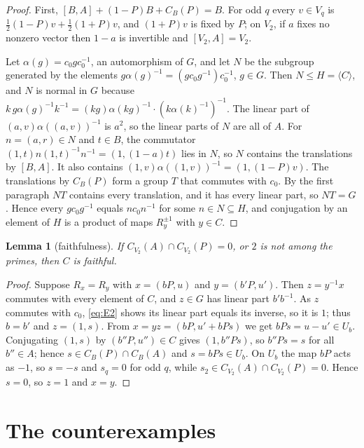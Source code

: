 \documentclass[11pt]{article}
\newtheorem{lemma}[theorem]{Lemma}
\begin{document}
\begin{proof}
First, $[B,A]+(1-P)B+C_B(P)=B$. For odd $q$ every $v\in V_q$ is
$\frac12(1-P)v+\frac12(1+P)v$, and $(1+P)v$ is fixed by $P$; on $V_2$, if
$a$ fixes no nonzero vector then $1-a$ is invertible and $[V_2,A]=V_2$.

Let $\alpha(g)=c_0gc_0^{-1}$, an automorphism of $G$, and let $N$ be the
subgroup generated by the elements $g\alpha(g)^{-1}=(gc_0g^{-1})c_0^{-1}$,
$g\in G$. Then $N\le H=\langle C\rangle$, and $N$ is normal in $G$ because
$k\,g\alpha(g)^{-1}k^{-1}=(kg)\alpha(kg)^{-1}\cdot(k\alpha(k)^{-1})^{-1}$.
The linear part of $(a,v)\alpha((a,v))^{-1}$ is $a^2$, so the linear parts
of $N$ are all of $A$. For $n=(a,r)\in N$ and $t\in B$, the commutator
$(1,t)n(1,t)^{-1}n^{-1}=(1,(1-a)t)$ lies in $N$, so $N$ contains the
translations by $[B,A]$. It also contains $(1,v)\alpha((1,v))^{-1}=
(1,(1-P)v)$. The translations by $C_B(P)$ form a group $T$ that commutes
with $c_0$. By the first paragraph $NT$ contains every translation, and it
has every linear part, so $NT=G$. Hence every $gc_0g^{-1}$ equals
$nc_0n^{-1}$ for some $n\in N\subseteq H$, and conjugation by an element of
$H$ is a product of maps $R_y^{\pm1}$ with $y\in C$.
\end{proof}

\begin{lemma}[faithfulness]\label{lem:faith}
If $C_{V_2}(A)\cap C_{V_2}(P)=0$, or $2$ is not among the primes, then $C$
is faithful.
\end{lemma}

\begin{proof}
Suppose $R_x=R_y$ with $x=(bP,u)$ and $y=(b'P,u')$. Then $z=y^{-1}x$
commutes with every element of $C$, and $z\in G$ has linear part $b'b^{-1}$.
As $z$ commutes with $c_0$, \eqref{eq:E2} shows its linear part equals its
inverse, so it is $1$; thus $b=b'$ and $z=(1,s)$. From $x=yz=(bP,u'+bPs)$
we get $bPs=u-u'\in U_b$. Conjugating $(1,s)$ by $(b''P,u'')\in C$ gives
$(1,b''Ps)$, so $b''Ps=s$ for all $b''\in A$; hence $s\in C_B(P)\cap
C_B(A)$ and $s=bPs\in U_b$. On $U_b$ the map $bP$ acts as $-1$, so $s=-s$
and $s_q=0$ for odd $q$, while $s_2\in C_{V_2}(A)\cap C_{V_2}(P)=0$.
Hence $s=0$, so $z=1$ and $x=y$.
\end{proof}

\section{The counterexamples}\label{sec:examples}
\end{document}
